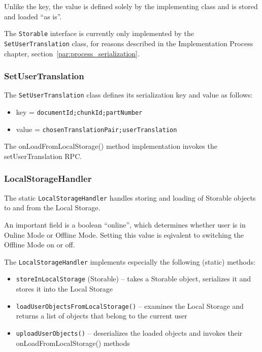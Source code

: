 Unlike the key, the value is defined solely by the implementing class and is stored and loaded ``as is''.

The {\tt Storable} interface is currently only implemented by the {\tt SetUserTranslation} class, for reasons described in the Implementation Process chapter, section~\ref{par:process_serialization}.

\subsubsection{SetUserTranslation}

The {\tt SetUserTranslation} class defines its serialization key and value as follows:

\begin{itemize}
\item key = {\tt documentId;chunkId;partNumber}
\item value = {\tt chosenTranslationPair;userTranslation}
\end{itemize}

The onLoadFromLocalStorage() method implementation invokes the setUserTranslation RPC.

\subsubsection{LocalStorageHandler}

The static {\tt LocalStorageHandler} handles storing and loading of Storable objects to and from the Local Storage.

An important field is a boolean ``online'', which determines whether user is in Online Mode or Offline Mode. Setting this value is eqivalent to switching the Offline Mode on or off.

The {\tt LocalStorageHandler} implements especially the following (static) methods:

\begin{itemize}
\item {\tt storeInLocalStorage} (Storable) -- takes a Storable object, serializes it and stores it into the Local Storage

\item {\tt loadUserObjectsFromLocalStorage()} -- examines the Local Storage and returns a list of objects that belong to the current user

\item {\tt uploadUserObjects()} -- deserializes the loaded objects and invokes their onLoadFromLocalStorage() methods
\end{itemize}

